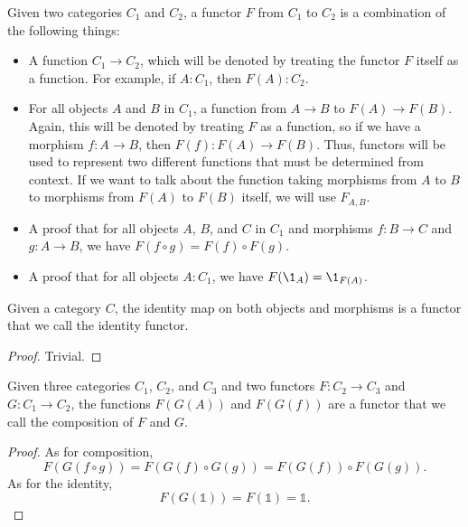 \documentclass[../math.tex]{subfiles}
\begin{document}
\begin{definition}
    Given two categories $C_1$ and $C_2$, a functor $F$ from $C_1$ to $C_2$ is a
    combination of the following things:
    \begin{itemize}
        \item A function $C_1 \to C_2$, which will be denoted by treating the
            functor $F$ itself as a function.  For example, if $A : C_1$, then
            $F(A) : C_2$.
        \item For all objects $A$ and $B$ in $C_1$, a function from $A \to B$ to
            $F(A) \to F(B)$.  Again, this will be denoted by treating $F$ as a
            function, so if we have a morphism $f : A \to B$, then $F(f) : F(A)
            \to F(B)$.  Thus, functors will be used to represent two different
            functions that must be determined from context.  If we want to talk
            about the function taking morphisms from $A$ to $B$ to morphisms
            from $F(A)$ to $F(B)$ itself, we will use $F_{A,B}$.
        \item A proof that for all objects $A$, $B$, and $C$ in $C_1$ and
            morphisms $f : B \to C$ and $g : A \to B$, we have $F(f \circ g) =
            F(f) \circ F(g)$.
        \item A proof that for all objects $A : C_1$, we have $F(\1_A) =
            \1_{F(A)}$.
    \end{itemize}
\end{definition}

\begin{theorem}
    Given a category $C$, the identity map on both objects and morphisms is a
    functor that we call the identity functor.
\end{theorem}
\begin{proof}
    Trivial.
\end{proof}

\begin{theorem}
    Given three categories $C_1$, $C_2$, and $C_3$ and two functors $F : C_2 \to
    C_3$ and $G : C_1 \to C_2$, the functions $F(G(A))$ and $F(G(f))$ are a
    functor that we call the composition of $F$ and $G$.
\end{theorem}
\begin{proof}
    As for composition,
    \[
        F(G(f \circ g)) = F(G(f) \circ G(g)) = F(G(f)) \circ F(G(g)).
    \]
    As for the identity,
    \[
        F(G(\mathds 1)) = F(\mathds 1) = \mathds 1.
    \]
\end{proof}
\end{document}
